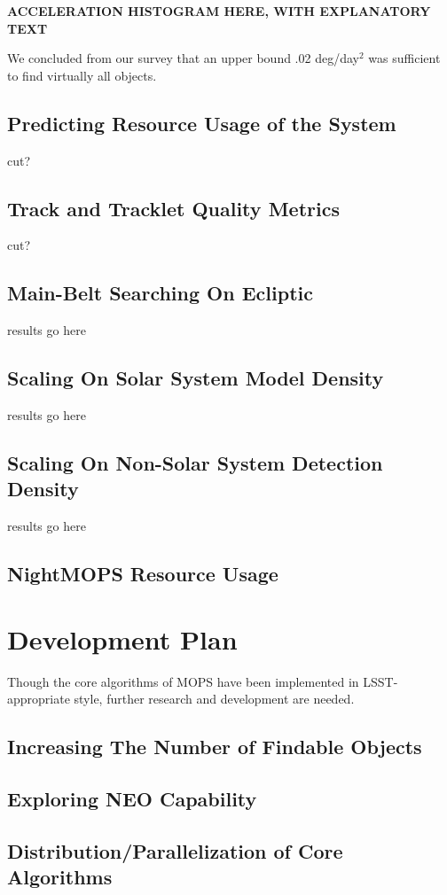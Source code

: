 \documentclass[12pt,preprint]{aastex}
\begin{document}
\textbf{ACCELERATION HISTOGRAM HERE, WITH EXPLANATORY TEXT}

We concluded from our survey that an upper bound .02 deg/day$^2$ was
sufficient to find virtually all objects.



\subsection{Predicting Resource Usage of the System}
cut?
\subsection{Track and Tracklet Quality Metrics}
cut?
\subsection{Main-Belt Searching On Ecliptic}
results go here
\subsection{Scaling On Solar System Model Density}
results go here
\subsection{Scaling On Non-Solar System Detection Density}
results go here
\subsection{NightMOPS Resource Usage}


















\section{Development Plan}

Though the core algorithms of MOPS have been implemented in
LSST-appropriate style, further research and development are needed.

\subsection{Increasing The Number of Findable Objects}

\subsection{Exploring NEO Capability}

\subsection{Distribution/Parallelization of Core Algorithms}







\end{document}
